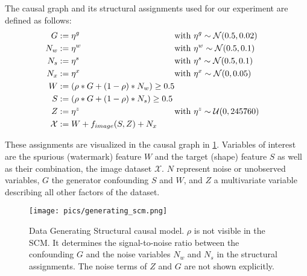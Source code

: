 The causal graph and its structural assignments used for our experiment are defined as follows: 
\begin{equation}
\label{eq:scm}
\begin{aligned}[c]
G&:=\eta^g \notag \\ 
N_w&:=\eta^w  \notag \\ 
N_s&:=\eta^s \notag \\ 
N_x&:=\eta^x  \notag \\ 
W&:=(\rho * G + (1-\rho)* N_w) \geq 0.5 \notag \\ 
S&:=(\rho * G + (1-\rho)* N_s) \geq 0.5 \notag \\ 
Z&:= \eta^z \\ 
\mathcal{X}&:= W + f_{image}(S, Z) + N_{x} \\
\end{aligned}
\begin{aligned}[c]
& \mathrm{with} \  \eta^g \sim \mathcal{N}(0.5,0.02) && \notag \\ 
& \mathrm{with} \  \eta^w \sim \mathcal{N}(0.5,0.1) && \notag \\ 
& \mathrm{with} \  \eta^s \sim \mathcal{N}(0.5,0.1) && \notag \\ 
& \mathrm{with} \  \eta^x \sim \mathcal{N}(0,0.05) && \notag \\ 
\\
\\
& \mathrm{with} \  \eta^z \sim \mathcal{U}(0,245760) && \notag \\ 
\\
\end{aligned}
\end{equation}

These assignments are visualized in the causal graph in \cref{fig:generating_scm}.
Variables of interest are the spurious (watermark) feature $W$ and the target (shape) feature $S$ as well as their combination, the image dataset $\mathcal{X}$. $N$ represent noise or unobserved variables, $G$ the generator confounding $S$ and $W$, and $Z$ a multivariate variable describing all other factors of the dataset. 

\begin{figure}[t!]
    \centering
    \texttt{[image: pics/generating\_scm.png]}
    \caption[Data Generating SCM]{Data Generating Structural causal model.
        $\rho$ is not visible in the SCM. It determines the signal-to-noise ratio between the confounding $G$ and the noise variables $N_w$ and $N_s$ in the structural assignments. The noise terms of $Z$ and $G$ are not shown explicitly.}
    \label{fig:generating_scm}
\end{figure}

